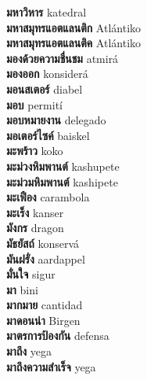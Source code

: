 \textbf{ มหาวิหาร  } katedral \\
\textbf{ มหาสมุทรแอตแลนติก  } Atlántiko \\
\textbf{ มหาสมุทรแอตแลนติค  } Atlántiko \\
\textbf{ มองด้วยความชื่นชม  } atmirá \\
\textbf{ มองออก  } konsiderá \\
\textbf{ มอนสเตอร์  } diabel \\
\textbf{ มอบ  } permití \\
\textbf{ มอบหมายงาน  } delegado \\
\textbf{ มอเตอร์ไซค์  } baiskel \\
\textbf{ มะพร้าว  } koko \\
\textbf{ มะม่วงหิมพานต์  } kashupete \\
\textbf{ มะม่วมหิมพานต์  } kashipete \\
\textbf{ มะเฟือง  } carambola \\
\textbf{ มะเร็ง  } kanser \\
\textbf{ มังกร  } dragon \\
\textbf{ มัธยัสถ์  } konservá \\
\textbf{ มันฝรั่ง  } aardappel \\
\textbf{ มั่นใจ  } sigur \\
\textbf{ มา  } bini \\
\textbf{ มากมาย  } cantidad \\
\textbf{ มาดอนน่า  } Birgen \\
\textbf{ มาตรการป้องกัน  } defensa \\
\textbf{ มาถึง  } yega \\
\textbf{ มาถึงความสำเร็จ  } yega \\
